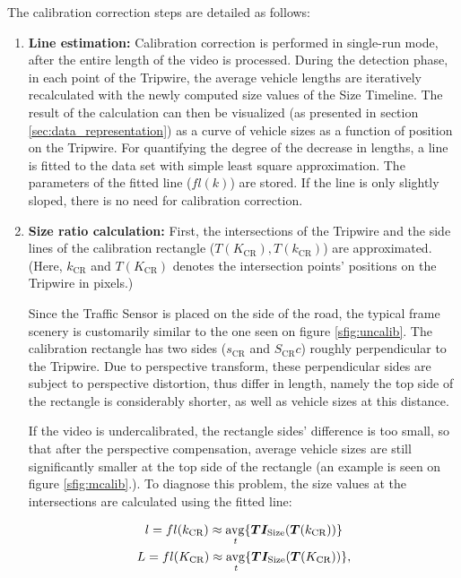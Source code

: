 \noindent The calibration correction steps are detailed as follows:
\begin{enumerate}
	\item  \textbf{Line estimation:} 
	Calibration correction is performed in single-run mode, after the entire length of the video is processed.
	During the detection phase, in each point of the Tripwire, the average vehicle lengths are iteratively recalculated with the newly computed size values of the Size Timeline.
	The result of the calculation can then be visualized (as presented in section \ref{sec:data_representation}) as a curve of vehicle sizes as a function of position on the Tripwire.
	For quantifying the degree of the decrease in lengths, a line is fitted to the data set with simple least square approximation.
	The parameters of the fitted line ($fl(k)$) are stored.
	If the line is only slightly sloped, there is no need for calibration correction. 
	
	\item  \textbf{Size ratio calculation:}
	First, the intersections of the Tripwire and the side lines of the calibration rectangle ($T(K_{\text{CR}}), T(k_{\text{CR}})$) are approximated.
	(Here, $k_{\text{CR}}$ and $T(K_{\text{CR}})$ denotes the intersection points' positions on the Tripwire in pixels.)
	
	Since the Traffic Sensor is placed on the side of the road, the typical frame scenery is customarily similar to the one seen on figure \ref{sfig:uncalib}.
	The calibration rectangle has two sides ($s_{\text{CR}}$ and $S_{\text{CR}}c$) roughly perpendicular to the Tripwire.
	Due to perspective transform, these perpendicular sides are subject to perspective distortion, thus differ in length, namely the top side of the rectangle is considerably shorter, as well as vehicle sizes at this distance.
	
	If the video is undercalibrated, the rectangle sides' difference is too small, so that after the perspective compensation, average vehicle sizes are still significantly smaller at the top side of the rectangle (an example is seen on figure \ref{sfig:mcalib}.).
	To diagnose this problem, the size values at the intersections are calculated using the fitted line:
	
	\begin{gather*}
		l = fl(k_{\text{CR}}) \approx \operatorname{\underset{\textit{t}}{avg}}\{\boldsymbol{TI_{\text{Size}}}(\boldsymbol{T}(k_{\text{CR}}))\} \\
		L = fl(K_{\text{CR}}) \approx \operatorname{\underset{\textit{t}}{avg}}\{\boldsymbol{TI_{\text{Size}}}(\boldsymbol{T}(K_{\text{CR}}))\},
	\end{gather*}
	

\end{enumerate}
